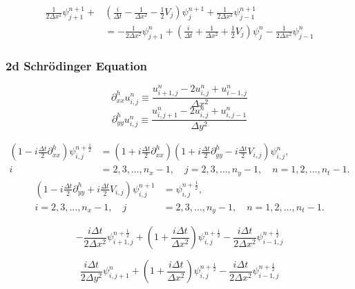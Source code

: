 \documentclass[10pt]{article}
\begin{document}

\begin{align}\label{CN_rearranged}
\frac{1}{2 \Delta x^2}\psi_{j+1}^{n+1} + & \left( \frac{i}{\Delta t} - \frac{1}{\Delta x^2}
-\frac{1}{2}V_j \right) \psi_j^{n+1} + \frac{1}{2 \Delta x^2} \psi_{j-1}^{n+1} \\
& = -\frac{1}{2 \Delta x^2} \psi_{j+1}^n + \left(\frac{i}{\Delta t} + \frac{1}{\Delta x^2}
+ \frac{1}{2}V_j \right) \psi_j^n - \frac{1}{2 \Delta x^2} \psi_{j-1}^n
\end{align}


\subsubsection*{2d Schrödinger Equation}

$$\partial_{xx}^h u_{i,j}^n \equiv \frac{u_{i+1,j}^n - 2u_{i,j}^n + u_{i-1,j}^n}{\Delta x^2}$$
$$\partial_{yy}^h u_{i,j}^n \equiv \frac{u_{i,j+1}^n - 2u_{i,j}^n + u_{i,j-1}^n}{\Delta y^2}$$

\begin{align}\label{ADI_1}
\left( 1 - i \frac{\Delta t}{2} \partial_{xx}^h \right) \psi_{i,j}^{n+\frac{1}{2}} &=
\left( 1 + i \frac{\Delta t}{2} \partial_{xx}^h \right)
\left( 1 + i \frac{\Delta t}{2} \partial_{yy}^h - i \frac{\Delta t}{2} V_{i,j} \right) \psi_{i,j}^n,
\nonumber \\ i &= 2,3,\ldots,n_x-1, \quad j = 2,3,\ldots,n_y-1, \quad n = 1,2,\ldots,n_t-1.
\end{align}
\begin{align}\label{ADI_2}
\left( 1 - i \frac{\Delta t}{2} \partial_{yy}^h + i \frac{\Delta t}{2} V_{i,j} \right) 
\psi_{i,j}^{n+1} &= \psi_{i,j}^{n+\frac{1}{2}},
\nonumber \\ i = 2,3,\ldots,n_x-1, \quad j &= 2,3,\ldots,n_y-1, \quad n = 1,2,\ldots,n_t-1.
\end{align}


\begin{equation}\label{n_half_LHS}
-\frac{i \Delta t}{2 \Delta x^2} \psi_{i+1,j}^{n+\frac{1}{2}} + \left(1 + 
\frac{i \Delta t}{\Delta x^2} \right) \psi_{i,j}^{n+\frac{1}{2}} - \frac{i \Delta t}{2 \Delta x^2} 
\psi_{i-1,j}^{n+\frac{1}{2}}
\end{equation}

\begin{equation}\label{n_half_RHS_1}
\frac{i \Delta t}{2 \Delta y^2} \psi_{i,j+1}^{n} + \left(1 + 
\frac{i \Delta t}{\Delta x^2} \right) \psi_{i,j}^{n+\frac{1}{2}} - \frac{i \Delta t}{2 \Delta x^2} 
\psi_{i-1,j}^{n+\frac{1}{2}}
\end{equation}
\end{document}
